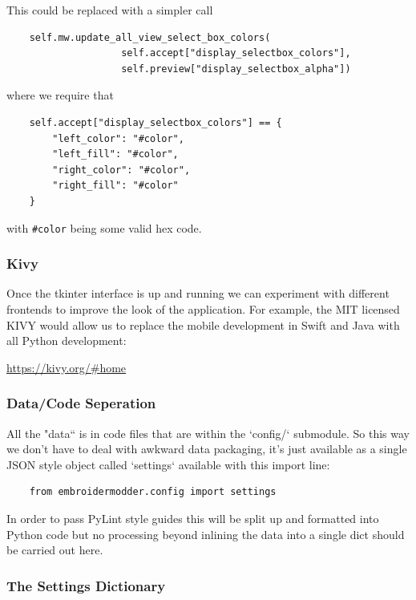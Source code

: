 \documentclass[a4paper, 11pt]{report}
\begin{document}
This could be replaced with a simpler call

\begin{verbatim}
    self.mw.update_all_view_select_box_colors(
                    self.accept["display_selectbox_colors"],
                    self.preview["display_selectbox_alpha"])
\end{verbatim}

where we require that

\begin{verbatim}
    self.accept["display_selectbox_colors"] == {
        "left_color": "#color",
        "left_fill": "#color",
        "right_color": "#color",
        "right_fill": "#color"
    }
\end{verbatim}

with \texttt{\#color} being some valid hex code.

\subsubsection{Kivy}

Once the tkinter interface is up and running we can experiment
with different frontends to improve the look of the application.
For example, the MIT licensed KIVY would allow us to replace the 
mobile development in Swift and Java with all Python development:

\url{https://kivy.org/#home}

\subsubsection{Data/Code Seperation}

All the "data`` is in code files that are within the `config/`
submodule. So this way we don't have to deal with awkward data
packaging, it's just available as a single JSON style object
called `settings` available with this import line:

\begin{verbatim}
    from embroidermodder.config import settings
\end{verbatim}

In order to pass PyLint style guides this will be split up and
formatted into Python code but no processing beyond inlining
the data into a single dict should be carried out here.

\subsubsection{The Settings Dictionary}
\end{document}
